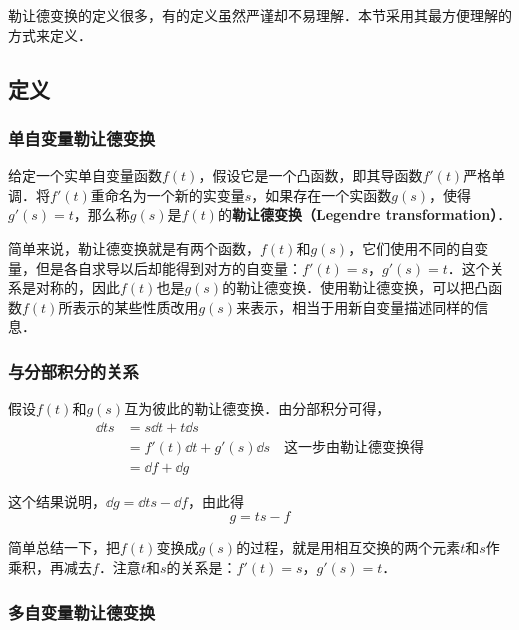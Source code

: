 

勒让德变换的定义很多，有的定义虽然严谨却不易理解．本节采用其最方便理解的方式来定义．

\subsection{定义}

\subsubsection{单自变量勒让德变换}
\begin{definition}{}
给定一个实单自变量函数$f(t)$，假设它是一个凸函数，即其导函数$f'(t)$严格单调．将$f'(t)$重命名为一个新的实变量$s$，如果存在一个实函数$g(s)$，使得$g'(s)=t$，那么称$g(s)$是$f(t)$的\textbf{勒让德变换（Legendre transformation）}．
\end{definition}

简单来说，勒让德变换就是有两个函数，$f(t)$和$g(s)$，它们使用不同的自变量，但是各自求导以后却能得到对方的自变量：$f'(t)=s$，$g'(s)=t$．这个关系是对称的，因此$f(t)$也是$g(s)$的勒让德变换．使用勒让德变换，可以把凸函数$f(t)$所表示的某些性质改用$g(s)$来表示，相当于用新自变量描述同样的信息．

\subsubsection{与分部积分的关系}

假设$f(t)$和$g(s)$互为彼此的勒让德变换．由分部积分可得，
\begin{equation}
\begin{aligned}
\dd{ts}&=s\dd{t}+t\dd{s}\\&=f'(t)\dd{t}+g'(s)\dd{s}\quad\text{这一步由勒让德变换得}\\&=\dd{f}+\dd{g}
\end{aligned}
\end{equation}

这个结果说明，$\dd{g}=\dd{ts}-\dd{f}$，由此得
\begin{equation}
g=ts-f
\end{equation}

简单总结一下，把$f(t)$变换成$g(s)$的过程，就是用相互交换的两个元素$t$和$s$作乘积，再减去$f$．注意$t$和$s$的关系是：$f'(t)=s$，$g'(s)=t$．

\subsubsection{多自变量勒让德变换}

